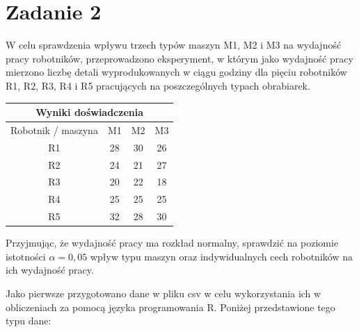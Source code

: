 \documentclass{article}
\begin{document}

\newpage
\section{Zadanie 2}
W celu sprawdzenia wpływu trzech typów maszyn M1, M2 i M3 na wydajność pracy
robotników, przeprowadzono eksperyment, w którym jako wydajność pracy mierzono
liczbę detali wyprodukowanych w ciągu godziny dla pięciu robotników R1, R2, R3, R4
i R5 pracujących na poszczególnych typach obrabiarek.
\begin{center} \begin{tabular}{|c|ccc|} 
\multicolumn{4}{c}{Wyniki doświadczenia} \\ \hline
Robotnik / maszyna & M1 & M2 & M3 \\ \hline
R1 & 28 & 30 & 26 \\ 
R2 & 24 & 21 & 27 \\ 
R3 & 20 & 22 & 18 \\ 
R4 & 25 & 25 & 25 \\ 
R5 & 32 & 28 & 30 \\ \hline
\end{tabular} \end{center}
Przyjmując, że wydajność pracy ma rozkład normalny, sprawdzić na poziomie istotności
$\alpha = 0,05$ wpływ typu maszyn oraz indywidualnych cech robotników na ich wydajność
pracy. \\ \par

Jako pierwsze przygotowano dane w pliku csv w celu wykorzystania ich w obliczeniach za pomocą języka programowania R. Poniżej przedstawione tego typu dane:
\begin{center}
\end{center}
\end{document}
